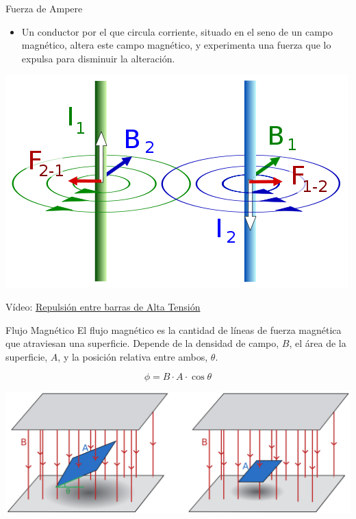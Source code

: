\documentclass[xcolor={usenames,svgnames,dvipsnames}]{beamer}
\begin{document}
\begin{frame}[label={sec:org7a0d5ae}]{Fuerza de Ampere}
\begin{itemize}
\item Un conductor por el que circula corriente, situado en el seno de un
campo magnético, altera este campo magnético, y experimenta una
fuerza que lo expulsa para disminuir la alteración.
\end{itemize}

\begin{center}
\includegraphics[width=.9\linewidth]{../figs/FuerzasRepulsion.png}
\end{center}

\begin{center}
Vídeo: \href{http://www.youtube.com/watch?v=2j8D\_N1v0tU}{Repulsión entre barras de Alta Tensión}
\end{center}
\end{frame}

\begin{frame}[label={sec:orgd0a1044}]{Flujo Magnético}
El flujo magnético es la cantidad de líneas de fuerza magnética que atraviesan una superficie. Depende de la densidad de campo, \(B\), el área de la superficie, \(A\), y la posición relativa entre ambos, \(\theta\).

\[
\phi = B \cdot A \cdot \cos \theta
\]

\begin{center}
\includegraphics[width=.9\linewidth]{../figs/flujo_magnetico.pdf}
\end{center}
\end{frame}
\end{document}
